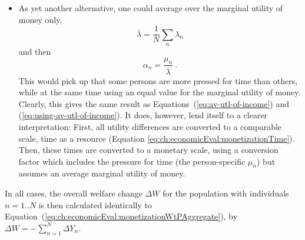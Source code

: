 \begin{itemize}
\item As yet another alternative, one could average over the marginal utility of money only, \ie 
\[
\overline\lambda = \frac{1}{N} \sum_n \lambda_n
\]
and then
\begin{equation}
\alpha_n = \frac{\mu_n}{\overline\lambda} \ .
\label{eq:resource-vot-w-equitable-income}
\end{equation}
This would pick up that some persons are more pressed for time than others, while at the same time using an equal value for the marginal utility of money.
%
Clearly, this gives the same result as Equations~(\ref{eq:av-utl-of-income}) and (\ref{eq:using-av-utl-of-income}).  It does, however, lend itself to a clearer interpretation: First, all utility differences are converted to a comparable scale, \ie time as a resource (Equation \ref{eq:ch:economicEval:monetizationTime}).  Then, these times are converted to a monetary scale, using a conversion factor which includes the pressure for time (\ie the person-specific $\mu_n$) but assumes an average marginal utility of money. 








\end{itemize}
In all cases, the overall welfare change $\Delta W$ for the population with individuals $n=1..N$ is then calculated identically to Equation~(\ref{eq:ch:economicEval:monetizationWtPAggregate}), \ie by $\Delta W = - \sum_{n=1}^N \Delta Y_n$.


